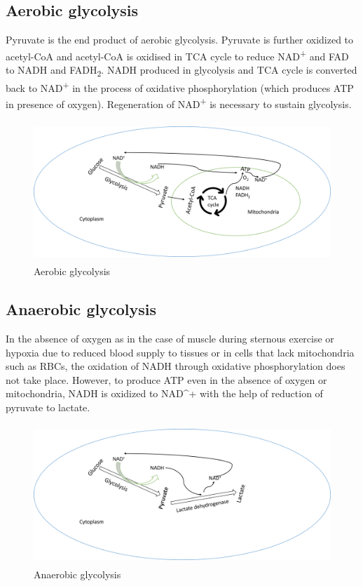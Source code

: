 \documentclass[
]{book}
\begin{document}
\subsection{Aerobic glycolysis}\label{aerobic-glycolysis}

Pyruvate is the end product of aerobic glycolysis. Pyruvate is further oxidized to acetyl-CoA and acetyl-CoA is oxidised in TCA cycle to reduce NAD\textsuperscript{+} and FAD to NADH and FADH\textsubscript{2}. NADH produced in glycolysis and TCA cycle is converted back to NAD\textsuperscript{+} in the process of oxidative phosphorylation (which produces ATP in presence of oxygen). Regeneration of NAD\textsuperscript{+} is necessary to sustain glycolysis.

\begin{figure}
\centering
\includegraphics[width=\textwidth,height=2.08333in]{Images/AerobicGlycolysis.png}
\caption{Aerobic glycolysis}
\end{figure}

\subsection{Anaerobic glycolysis}\label{anaerobic-glycolysis}

In the absence of oxygen as in the case of muscle during sternous exercise or hypoxia due to reduced blood supply to tissues or in cells that lack mitochondria such as RBCs, the oxidation of NADH through oxidative phosphorylation does not take place. However, to produce ATP even in the absence of oxygen or mitochondria, NADH is oxidized to NAD\^{}+ with the help of reduction of pyruvate to lactate.

\begin{figure}
\centering
\includegraphics[width=\textwidth,height=2.08333in]{Images/AnaerobicGlycolysis.png}
\caption{Anaerobic glycolysis}
\end{figure}
\end{document}
